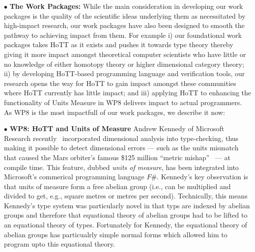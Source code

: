 \documentclass[a4paper,11pt]{article}
\begin{document}
\vspace*{0.02in}

$\bullet$ {\bf The Work Packages:} While the main consideration in
developing our work packages is the quality of the scientific ideas
underlying them as necessitated by high-impact research, our work
packages have also been designed to smooth the pathway to achieving
impact from them. For example i) our foundational work packages takes
HoTT as it exists and pushes it towards type theory thereby giving it 
more impact amongst  theoretical computer scientists who have little or
no knowledge of either homotopy theory or higher dimensional category
theory; ii) by developing HoTT-based programming language and
verification tools, our research opens the way for HoTT to gain impact
amongst these communities where HoTT currently has little impact; and 
iii) applying HoTT to enhancing the functionality of Units Measure
in WP8 delivers impact to actual programmers. As WP8 is the most
impactfull of our work packages, we describe it now:

\vspace*{0.02in}

$\bullet$ {\bf WP8: HoTT and Units of Measure} Andrew Kennedy of
Microsoft Research recently~\cite{aknn97} incorporated dimensional
analysis into type-checking, thus making it possible to detect
dimensional errors --- such as the units mismatch that caused the Mars
orbiter's famous \$125 million ``metric mishap''~\cite{wp99} --- at
compile time. This feature, dubbed {\em units of measure}, has been
integrated into Microsoft's commerical programming language $F\#$.
Kennedy's key observation is that units of measure form a free abelian
group (i.e., can be multiplied and divided to get, e.g., square metres
or metres per second). Technically, this means Kennedy's type system
was particularly novel in that typs are indexed by abelian groups and
therefore that equational theory of abelian groups
had to be lifted to an equational theory of types. Fortunately for
Kennedy, the equational theory of abelian groups has particualrly
simple normal forms which allowed him to program upto this equational
theory.
\end{document}
